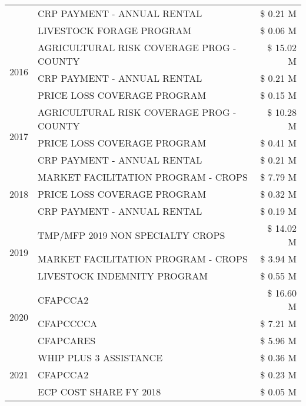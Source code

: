 \begin{tabular}{llr}
 & CRP PAYMENT - ANNUAL RENTAL & \$ 0.21 M \\
 & LIVESTOCK FORAGE PROGRAM & \$ 0.06 M \\
\cline{1-3}
\multirow[t]{3}{*}{2016} & AGRICULTURAL RISK COVERAGE PROG - COUNTY & \$ 15.02 M \\
 & CRP PAYMENT - ANNUAL RENTAL & \$ 0.21 M \\
 & PRICE LOSS COVERAGE PROGRAM & \$ 0.15 M \\
\cline{1-3}
\multirow[t]{3}{*}{2017} & AGRICULTURAL RISK COVERAGE PROG - COUNTY & \$ 10.28 M \\
 & PRICE LOSS COVERAGE PROGRAM & \$ 0.41 M \\
 & CRP PAYMENT - ANNUAL RENTAL & \$ 0.21 M \\
\cline{1-3}
\multirow[t]{3}{*}{2018} & MARKET FACILITATION PROGRAM - CROPS & \$ 7.79 M \\
 & PRICE LOSS COVERAGE PROGRAM & \$ 0.32 M \\
 & CRP PAYMENT - ANNUAL RENTAL & \$ 0.19 M \\
\cline{1-3}
\multirow[t]{3}{*}{2019} & TMP/MFP 2019 NON SPECIALTY CROPS & \$ 14.02 M \\
 & MARKET FACILITATION PROGRAM - CROPS & \$ 3.94 M \\
 & LIVESTOCK INDEMNITY PROGRAM & \$ 0.55 M \\
\cline{1-3}
\multirow[t]{3}{*}{2020} & CFAPCCA2 & \$ 16.60 M \\
 & CFAPCCCCA & \$ 7.21 M \\
 & CFAPCARES & \$ 5.96 M \\
\cline{1-3}
\multirow[t]{3}{*}{2021} & WHIP PLUS 3 ASSISTANCE & \$ 0.36 M \\
 & CFAPCCA2 & \$ 0.23 M \\
 & ECP COST SHARE FY 2018 & \$ 0.05 M \\
\cline{1-3}
\bottomrule
\end{tabular}
